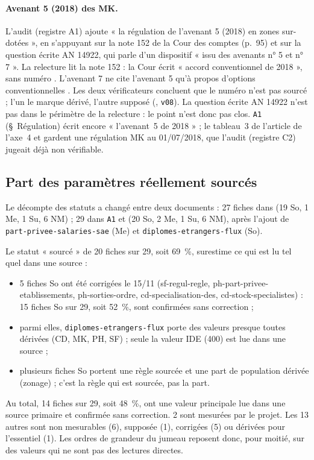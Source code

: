 \paragraph{Avenant 5 (2018) des MK.} L'audit (registre A1) ajoute « la régulation de l'avenant 5 (2018) en zones
sur-dotées », en s'appuyant sur la note 152 de la Cour des comptes (p.~95) et sur la question écrite AN 14922,
qui parle d'un dispositif « issu des avenants n° 5 et n° 7 ». La relecture lit la note 152 : la Cour écrit
« accord conventionnel de 2018 », sans numéro \citep{d-ccomptes2024}. L'avenant 7 ne cite l'avenant 5 qu'à
propos d'options conventionnelles \citep{d-avenant7mk}. Les deux vérificateurs concluent que le numéro n'est
pas sourcé ; l'un le marque dérivé, l'autre supposé (, \texttt{v08}). La question
écrite AN 14922 n'est pas dans le périmètre de la relecture : le point n'est donc pas clos. \texttt{A1} (\S~Régulation)
écrit encore « l'avenant~5 de 2018 » ; le tableau~3 de l'article de l'axe~4 et 
gardent une régulation MK au 01/07/2018, que l'audit (registre C2) jugeait déjà non vérifiable.

\subsection{Part des paramètres réellement sourcés}\label{par:sources}

Le décompte des statuts a changé entre deux documents : 27\mesure{} fiches dans  (19 So, 1 Me,
1 Su, 6 NM\mesure) ; 29\mesure{} dans \texttt{A1} et  (20 So, 2 Me, 1 Su, 6 NM\mesure),
après l'ajout de \texttt{part-privee-salaries-sae} (Me) et \texttt{diplomes-etrangers-flux} (So).

Le statut « sourcé » de 20\mesure{} fiches sur 29, soit 69~\%\derive, surestime ce qui est lu tel quel dans
une source :
\begin{itemize}
  \item 5\mesure{} fiches So ont été corrigées le 15/11 (sf-regul-regle, ph-part-privee-etablissements,
  ph-sorties-ordre, cd-specialisation-des, cd-stock-specialistes) : 15\derive{} fiches So sur 29, soit
  52~\%\derive, sont confirmées sans correction ;
  \item parmi elles, \texttt{diplomes-etrangers-flux} porte des valeurs presque toutes dérivées (CD, MK, PH,
  SF) ; seule la valeur IDE (400) est lue dans une source \citep{d-er1319} ;
  \item plusieurs fiches So portent une règle sourcée et une part de population dérivée (zonage) ; c'est la
  règle qui est sourcée, pas la part.
\end{itemize}
Au total, 14\derive{} fiches sur 29, soit 48~\%\derive, ont une valeur principale lue dans une source primaire
et confirmée sans correction. 2\mesure{} sont mesurées par le projet. Les 13\derive{} autres sont non
mesurables (6), supposée (1), corrigées (5) ou dérivées pour l'essentiel (1). Les ordres de grandeur du jumeau
reposent donc, pour moitié, sur des valeurs qui ne sont pas des lectures directes.
\endgroup
